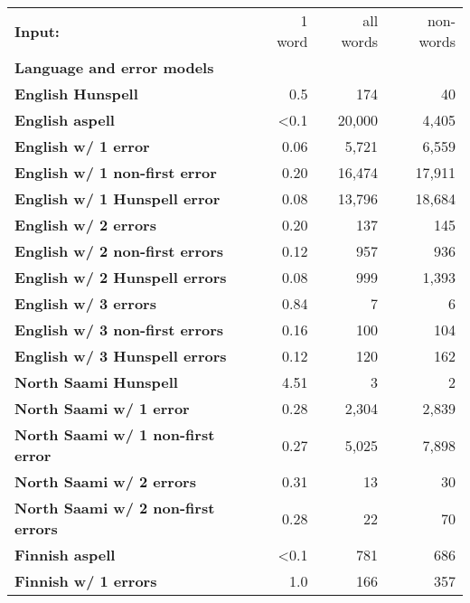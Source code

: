 \documentclass[a4paper,12pt]{article}
\begin{document}
\begin{table}
    \centering
    \begin{tabular}{|l|r|r|r|}
        \hline
        \bf Input: & 1 word & all words & non-words \\
        \bf Language and error models & & & \\
        \hline
        \bf English Hunspell & 0.5 & 174 & 40 \\
          \bf English aspell & <0.1 & 20,000 & 4,405 \\
        \hline
        \bf English w/ 1 error & 0.06 & 5,721 & 6,559 \\
 \bf English w/ 1 non-first error & 0.20 & 16,474 & 17,911 \\
 \bf English w/ 1 Hunspell error & 0.08 & 13,796 & 18,684 \\
     \bf English w/ 2 errors & 0.20 & 137 & 145 \\
 \bf English w/ 2 non-first errors & 0.12 & 957 & 936 \\
 \bf English w/ 2 Hunspell errors & 0.08 & 999 & 1,393 \\
   \bf English w/ 3 errors & 0.84 & 7 & 6 \\
 \bf English w/ 3 non-first errors & 0.16 & 100 & 104 \\
 \bf English w/ 3 Hunspell errors & 0.12 & 120 & 162 \\
        \hline
   \bf North Saami Hunspell & 4.51 & 3 & 2 \\
        \hline
        \bf North Saami w/ 1 error & 0.28 & 2,304 & 2,839 \\
\bf North Saami w/ 1 non-first error & 0.27 & 5,025 & 7,898 \\
       \bf North Saami w/ 2 errors & 0.31 & 13 & 30 \\
\bf North Saami w/ 2 non-first errors & 0.28 & 22 & 70 \\
        \hline
        \bf Finnish aspell & <0.1 & 781 & 686 \\
        \hline
        \bf Finnish w/ 1 errors & 1.0 & 166 & 357 \\

\end{tabular}
\end{table}
\end{document}
